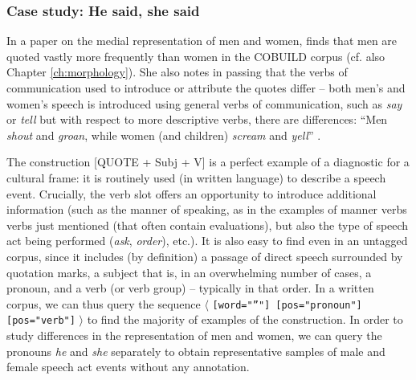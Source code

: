 \subsubsection{Case study: He said, she said}
\label{sec:hesaidshesaid}

In a paper on the medial representation of men and women, \citet{caldas-coulthard_discourse_1993} finds that men are quoted vastly more frequently than women in the COBUILD corpus (cf. also Chapter \ref{ch:morphology}). She also notes in passing that the verbs of communication used to introduce or attribute the quotes differ -- both men's and women's speech is introduced using general verbs of communication, such as \textit{say} or \textit{tell} but with respect to more descriptive verbs, there are differences: ``Men \textit{shout} and \textit{groan}, while women (and children) \textit{scream } and \textit{yell}'' \citep[204]{caldas-coulthard_discourse_1993}.

The construction [QUOTE + Subj + V] is a perfect example of a diagnostic for a cultural frame: it is routinely used (in written language) to describe a speech event. Crucially, the verb slot offers an opportunity to introduce additional information (such as the manner of speaking, as in the examples of manner verbs verbs just mentioned (that often contain evaluations), but also the type of speech act being performed (\textit{ask}, \textit{order}), etc.). It is also easy to find even in an untagged corpus, since it includes (by definition) a passage of direct speech surrounded by quotation marks, a subject that is, in an overwhelming number of cases, a pronoun, and a verb (or verb group) -- typically in that order. In a written corpus, we can thus query the sequence $\langle$  \texttt{[word="{''}"] [pos="pronoun"] [pos="verb"]} $\rangle$ to find the majority of examples of the construction. In order to study differences in the representation of men and women, we can query the pronouns \textit{he} and \textit{she} separately to obtain representative samples of male and female speech act events without any annotation.

